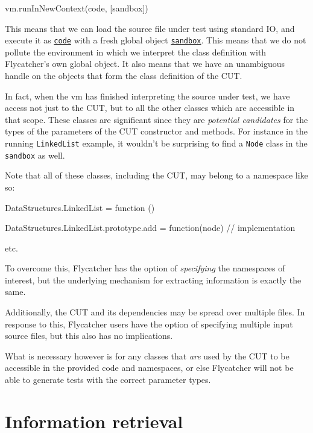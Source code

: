 \begin{verbcode}
   vm.runInNewContext(code, [sandbox])
\end{verbcode}

This means that we can load the source file under test using standard IO, and execute it as \texttt{\underline{code}} with a fresh global object \texttt{\underline{sandbox}}. This means that we do not pollute the environment in which we interpret the class definition with \textsf{Flycatcher}'s own global object. It also means that we have an unambiguous handle on the objects that form the class definition of the CUT.

In fact, when the vm has finished interpreting the source under test, we have access not just to the CUT, but to all the other classes which are accessible in that scope. These classes are significant since they are \emph{potential candidates} for the types of the parameters of the CUT constructor and methods. For instance in the running \texttt{LinkedList} example, it wouldn't be surprising to find a \texttt{Node} class in the \texttt{sandbox} as well.

Note that all of these classes, including the CUT, may belong to a namespace like so:

\begin{verbcode}
DataStructures.LinkedList = function () {
}

DataStructures.LinkedList.prototype.add = function(node) {
   // implementation
}

etc.
\end{verbcode}

To overcome this, \textsf{Flycatcher} has the option of \emph{specifying} the namespaces of interest, but the underlying mechanism for extracting information is exactly the same.

Additionally, the CUT and its dependencies may be spread over multiple files. In response to this, \textsf{Flycatcher} users have the option of specifying multiple input source files, but this also has no implications.

What is necessary however is for any classes that \emph{are} used by the CUT to be accessible in the provided code and namespaces, or else \textsf{Flycatcher} will not be able to generate tests with the correct parameter types.

\section{Information retrieval}
